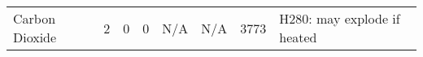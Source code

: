 \begin{landscape}
\begin{small}
\begin{longtable}{lcccS[table-format=3.1]S[table-format=3.0]S[table-format=5.8]l}
&  &  &  &  &  &  & \\ \midrule
Carbon Dioxide                                                                            & 2                                       & 0                                             & 0                                           & {N/A}                                                                                   & {N/A}                                                                                                     & 3773                                                                                                  & H280: may explode if heated                                                                                                                                                                                                                                                                                                                   \\ 

\end{longtable}
\end{small}
\end{landscape}
